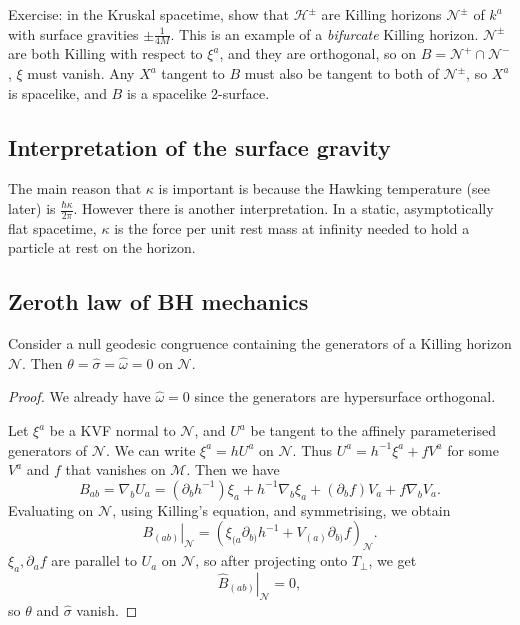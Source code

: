 \documentclass{jknotes}
\begin{document}
Exercise: in the Kruskal spacetime, show that \(\mathcal{H}^\pm\) are Killing horizons \(\mathcal{N}^\pm\) of \(k^a\) with surface gravities \(\pm\frac{1}{4M}\). This is an example of a \emph{bifurcate} Killing horizon. \(\mathcal{N}^\pm\) are both Killing with respect to \(\xi^a\), and they are orthogonal, so on \(B = \mathcal{N}^+\cap\mathcal{N}^-\), \(\xi\) must vanish. Any \(X^a\) tangent to \(B\) must also be tangent to both of \(\mathcal{N}^\pm\), so \(X^a\) is spacelike, and \(B\) is a spacelike 2-surface.

\subsection{Interpretation of the surface gravity}
The main reason that \(\kappa\) is important is because the Hawking temperature (see later) is \(\frac{\hbar\kappa}{2\pi}\). However there is another interpretation. In a static, asymptotically flat spacetime, \(\kappa\) is the force per unit rest mass at infinity needed to hold a particle at rest on the horizon.

\subsection{Zeroth law of BH mechanics}

\begin{lemma}
    Consider a null geodesic congruence containing the generators of a Killing horizon \(\mathcal{N}\). Then \(\theta = \hat{\sigma} = \hat{\omega} = 0\) on \(\mathcal{N}\).
\end{lemma}
\begin{proof}
    We already have \(\hat{\omega}=0\) since the generators are hypersurface orthogonal.

    Let \(\xi^a\) be a KVF normal to \(\mathcal{N}\), and \(U^a\) be tangent to the affinely parameterised generators of \(\mathcal{N}\). We can write \(\xi^a = hU^a\) on \(\mathcal{N}\). Thus \(U^a = h^{-1}\xi^a + fV^a\) for some \(V^a\) and \(f\) that vanishes on \(\mathcal{M}\). Then we have
    \begin{equation}
        B_{ab} = \nabla_bU_a = (\partial_bh^{-1})\xi_a + h^{-1}\nabla_b\xi_a + (\partial_bf)V_a + f\nabla_bV_a.
    \end{equation}
    Evaluating on \(\mathcal{N}\), using Killing's equation, and symmetrising, we obtain
    \begin{equation}
        \left.B_{(ab)}\right|_\mathcal{N} = \left(\xi_{(a}\partial_{b)}h^{-1} + V_{(a)}\partial_{b)}f\right)_\mathcal{N}.
    \end{equation}
    \(\xi_a,\partial_af\) are parallel to \(U_a\) on \(\mathcal{N}\), so after projecting onto \(T_\perp\), we get
    \begin{equation}
        \left.\hat{B}_{(ab)}\right|_\mathcal{N} = 0,
    \end{equation}
    so \(\theta\) and \(\hat{\sigma}\) vanish.
\end{proof}
\end{document}
